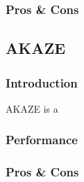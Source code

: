 		\subsubsection{Pros \& Cons}

	\subsection{AKAZE}
		\subsubsection{Introduction}
		AKAZE is a
		\subsubsection{Performance}
		\subsubsection{Pros \& Cons}
